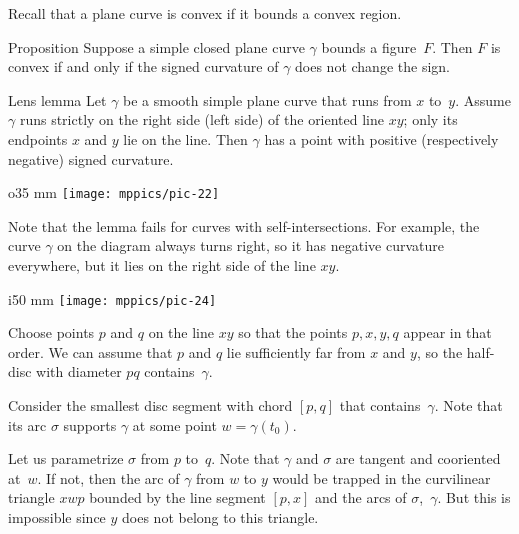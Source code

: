 Recall that a plane curve is convex if it bounds a convex region.

\begin{thm}{Proposition}\label{prop:convex}
Suppose a simple closed plane curve $\gamma$ bounds a figure~$F$.
Then $F$ is convex if and only if the signed curvature of $\gamma$ does not change the sign.
\end{thm}


\begin{thm}{Lens lemma}\label{lem:lens}
Let $\gamma$ be a smooth simple plane curve that runs from $x$ to~$y$.
Assume $\gamma$ runs strictly on the right side (left side) of the oriented line $xy$; only its endpoints $x$ and $y$ lie on the line.
Then $\gamma$ has a point with positive (respectively negative) signed curvature.
\end{thm}

{

\begin{wrapfigure}{o}{35 mm}
\vskip-4mm
\centering
\texttt{[image: mppics/pic-22]}
\vskip0mm
\end{wrapfigure}

Note that the lemma fails for curves with self-intersections.
For example, the curve $\gamma$ on the diagram always turns right, 
so it has negative curvature everywhere, but it lies on the right side of the line $xy$.

}

\begin{wrapfigure}[6]{i}{50 mm}
\vskip-3mm
\centering
\texttt{[image: mppics/pic-24]}
\end{wrapfigure}

Choose points $p$ and $q$ on the line $xy$
so that the points $p, x, y, q$ appear in that order.
We can assume that $p$ and $q$ lie sufficiently far from $x$ and $y$, so the half-disc with diameter $pq$ contains~$\gamma$.

Consider the smallest disc segment with chord $[p,q]$ that contains~$\gamma$.
Note that its arc $\sigma$ supports $\gamma$ at some point $w=\gamma(t_0)$.

Let us parametrize $\sigma$ from $p$ to~$q$.
Note that $\gamma$ and $\sigma$ are tangent and cooriented at~$w$.
If not, then the arc of $\gamma$ from $w$ to $y$ would be trapped in the curvilinear triangle $xwp$ bounded by the line segment $[p,x]$ and the arcs of $\sigma$,~$\gamma$.
But this is impossible since $y$ does not belong to this triangle.

